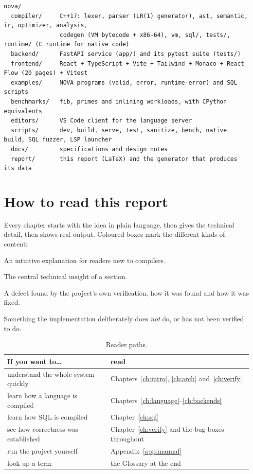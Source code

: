 \begin{lstlisting}[style=tiny,caption={Top-level layout of the repository.},label={lst:layout}]
nova/
  compiler/     C++17: lexer, parser (LR(1) generator), ast, semantic, ir, optimizer, analysis,
                codegen (VM bytecode + x86-64), vm, sql/, tests/, runtime/ (C runtime for native code)
  backend/      FastAPI service (app/) and its pytest suite (tests/)
  frontend/     React + TypeScript + Vite + Tailwind + Monaco + React Flow (20 pages) + Vitest
  examples/     NOVA programs (valid, error, runtime-error) and SQL scripts
  benchmarks/   fib, primes and inlining workloads, with CPython equivalents
  editors/      VS Code client for the language server
  scripts/      dev, build, serve, test, sanitize, bench, native build, SQL fuzzer, LSP launcher
  docs/         specifications and design notes
  report/       this report (LaTeX) and the generator that produces its data
\end{lstlisting}

\section{How to read this report}
Every chapter starts with the idea in plain language, then gives the technical detail, then shows real output. Coloured boxes mark the different kinds of content:

\begin{plain}
An intuitive explanation for readers new to compilers.
\end{plain}
\begin{keybox}
The central technical insight of a section.
\end{keybox}
\begin{bugbox}
A defect found by the project's own verification, how it was found and how it was fixed.
\end{bugbox}
\begin{warnbox}
Something the implementation deliberately does \emph{not} do, or has not been verified to do.
\end{warnbox}

\begin{table}[H]\centering\small
\begin{tabular}{@{}lp{}@{}}\toprule
\textbf{If you want to\ldots} & \textbf{read}\\ \midrule
understand the whole system quickly & Chapters~\ref{ch:intro}, \ref{ch:arch} and~\ref{ch:verify}\\
learn how a language is compiled & Chapters~\ref{ch:language}--\ref{ch:backends}\\
learn how SQL is compiled & Chapter~\ref{ch:sql}\\
see how correctness was established & Chapter~\ref{ch:verify} and the bug boxes throughout\\
run the project yourself & Appendix~\ref{app:manual}\\
look up a term & the Glossary at the end\\ \bottomrule
\end{tabular}
\caption{Reader paths.}
\end{table}

